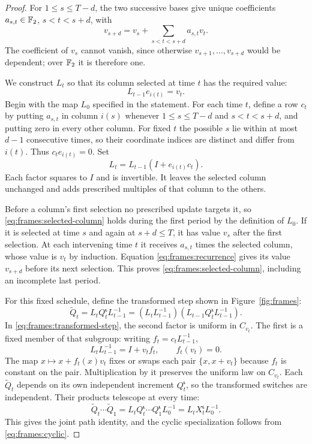 \begin{proof}
For $1\le s\le T-d$, the two successive bases give unique
coefficients $a_{s,t}\in\mathbb F_2$, $s<t<s+d$, with
\begin{equation}\label{eq:frames:recurrence}
 v_{s+d}=v_s+\sum_{s<t<s+d}a_{s,t}v_t.
\end{equation}
The coefficient of $v_s$ cannot vanish, since otherwise
$v_{s+1},\ldots,v_{s+d}$ would be dependent; over $\mathbb F_2$ it is
therefore one.

We construct $L_t$ so that its column selected at time $t$ has the
required value:
\begin{equation}\label{eq:frames:selected-column}
 L_{t-1}e_{i(t)}=v_t.
\end{equation}
Begin with the map $L_0$ specified in the statement. For each time
$t$, define a row $c_t$ by putting $a_{s,t}$ in column $i(s)$
whenever $1\le s\le T-d$ and $s<t<s+d$, and putting zero in every
other column. For fixed $t$ the possible $s$ lie within at most
$d-1$ consecutive times, so their coordinate indices are distinct and
differ from $i(t)$. Thus $c_te_{i(t)}=0$. Set
\begin{equation}\label{eq:frames:matrices}
 L_t=L_{t-1}(I+e_{i(t)}c_t).
\end{equation}
Each factor squares to $I$ and is invertible. It leaves the
selected column unchanged and adds prescribed multiples of that
column to the others.

Before a column's first selection no prescribed update targets it,
so \eqref{eq:frames:selected-column} holds during the first period
by the definition of $L_0$. If it is selected at time $s$ and again
at $s+d\le T$, it has value $v_s$ after the first selection. At
each intervening time $t$ it receives $a_{s,t}$ times the selected
column, whose value is $v_t$ by induction. Equation
\eqref{eq:frames:recurrence} gives its value $v_{s+d}$ before its
next selection. This proves \eqref{eq:frames:selected-column},
including an incomplete last period.

For this fixed schedule, define the transformed step shown in
Figure~\ref{fig:frames}:
\begin{equation}\label{eq:frames:transformed-step}
 \widetilde Q_t
 =L_tQ^{\boldsymbol\iota}_tL_{t-1}^{-1}
 =(L_tL_{t-1}^{-1})
   (L_{t-1}Q^{\boldsymbol\iota}_tL_{t-1}^{-1}).
\end{equation}
In \eqref{eq:frames:transformed-step}, the second factor is uniform in
$C_{v_t}$. The first is a fixed
member of that subgroup: writing $f_t=c_tL_{t-1}^{-1}$,
\[
 L_tL_{t-1}^{-1}=I+v_tf_t,\qquad f_t(v_t)=0.
\]
The map $x\mapsto x+f_t(x)v_t$ fixes or swaps each pair
$\{x,x+v_t\}$ because $f_t$ is constant on the pair. Multiplication
by it preserves the uniform law on $C_{v_t}$. Each
$\widetilde Q_t$ depends on its own independent increment
$Q^{\boldsymbol\iota}_t$, so the transformed switches are
independent. Their products telescope at every time:
\[
 \widetilde Q_t\cdots\widetilde Q_1
 =L_tQ^{\boldsymbol\iota}_t\cdots Q^{\boldsymbol\iota}_1L_0^{-1}
 =L_tX^{\boldsymbol\iota}_tL_0^{-1}.
\]
This gives the joint path identity, and the cyclic specialization
follows from \eqref{eq:frames:cyclic}.
\end{proof}

